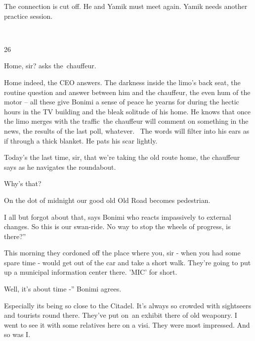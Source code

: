 \documentclass[12pt]{book}
\begin{document}
The connection is cut off. He and Yamik must meet again. Yamik needs another practice session.

~

26

{\textquotedbl}Home, sir?{\textquotedbl} asks the~chauffeur.

{\textquotedbl}Home indeed,{\textquotedbl} the CEO answers. The darkness inside{ }the limo's back seat,
the routine question and answer between him and the chauffeur, the even hum of the motor -- all these give Bonimi a
sense of peace he yearns for during the hectic hours in the TV building and the{ }bleak solitude of his
home. He knows that once the limo merges with the traffic~the chauffeur will comment on something in the news, the
results of the last poll, whatever. \ The words will filter into his ears as if through a thick blanket. He pats his
scar lightly.

{\textquotedbl}Today's the last time, sir, that we're taking the old route home,{\textquotedbl} the chauffeur says as he
navigates the roundabout.

{\textquotedbl}Why's that?{\textquotedbl}

{\textquotedbl}On the dot of midnight our good old Old Road becomes pedestrian.{\textquotedbl}

{\textquotedbl}I all but forgot about that,{\textquotedbl} says Bonimi who reacts impassively to external changes.
{\textquotedbl}So this is our swan-ride. No way to stop the wheels of progress, is there?''

{\textquotedbl}This morning they cordoned off the place where you, sir - when you had some spare time - would get out of
the car and take a short walk. They're going to put up a municipal information center there. 'MIC' for
short.{\textquotedbl}

{\textquotedbl}Well, it's about time -'' Bonimi agrees. {\ }

{\textquotedbl}Especially its being so close to the Citadel. It's always so crowded with sightseers and tourists round
there. They've put on~an exhibit there of old weaponry. I went to see it with some relatives here on a visi. They were
most impressed. And so was I.{\textquotedbl}
\end{document}

